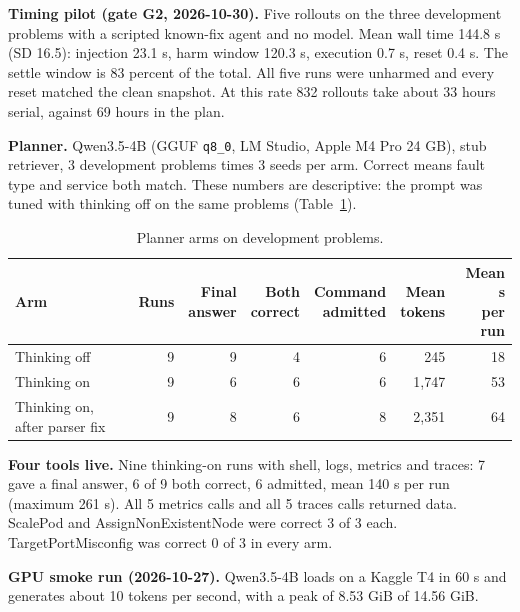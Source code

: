 \documentclass[10pt,conference]{IEEEtran}
\newcommand{\code}[1]{\texttt{#1}}
\begin{document}
\textbf{Timing pilot (gate G2, 2026-10-30).} Five rollouts on the three development
problems with a scripted known-fix agent and no model. Mean wall time 144.8 s (SD 16.5):
injection 23.1 s, harm window 120.3 s, execution 0.7 s, reset 0.4 s. The settle window is
83 percent of the total. All five runs were unharmed and every reset matched the clean
snapshot. At this rate 832 rollouts take about 33 hours serial, against 69 hours in the
plan.

\textbf{Planner.} Qwen3.5-4B (GGUF \code{q8\_0}, LM Studio, Apple M4 Pro 24 GB), stub
retriever, 3 development problems times 3 seeds per arm. Correct means fault type and
service both match. These numbers are descriptive: the prompt was tuned with thinking off
on the same problems (Table~\ref{tab:planner}).

\begin{table}[!t]
\caption{Planner arms on development problems.}
\label{tab:planner}
\centering\scriptsize
\setlength{\tabcolsep}{2pt}
\begin{tabular}{|p{1.8cm}|r|r|r|r|r|r|}
\hline
\bfseries Arm & \bfseries Runs & \bfseries \shortstack[r]{Final\\answer} & \bfseries \shortstack[r]{Both\\correct} & \bfseries \shortstack[r]{Command\\admitted} & \bfseries \shortstack[r]{Mean\\tokens} & \bfseries \shortstack[r]{Mean s\\per run}\\
\hline
Thinking off & 9 & 9 & 4 & 6 & 245 & 18\\
Thinking on & 9 & 6 & 6 & 6 & 1,747 & 53\\
Thinking on, after parser fix & 9 & 8 & 6 & 8 & 2,351 & 64\\
\hline
\end{tabular}
\end{table}

\textbf{Four tools live.} Nine thinking-on runs with shell, logs, metrics and traces: 7 gave
a final answer, 6 of 9 both correct, 6 admitted, mean 140 s per run (maximum 261 s). All 5
metrics calls and all 5 traces calls returned data. ScalePod and AssignNonExistentNode were
correct 3 of 3 each. TargetPortMisconfig was correct 0 of 3 in every arm.

\textbf{GPU smoke run (2026-10-27).} Qwen3.5-4B loads on a Kaggle T4 in 60 s and generates
about 10 tokens per second, with a peak of 8.53 GiB of 14.56 GiB.
\end{document}
